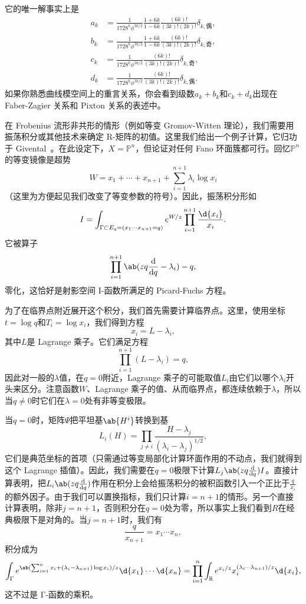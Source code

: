 \documentclass{amsart}
\theoremstyle{definition}
\theoremstyle{remark}
\theoremstyle{plain}
\theoremstyle{definition}
\theoremstyle{remark}
\newcommand{\R}{\mathbb{R}}
\renewcommand{\P}{\mathbb{P}}
\newcommand{\1}{\mathbf{1}}
\newcommand{\2}{\mathbf{2}}
\newcommand{\3}{\mathbf{3}}
\begin{document}
它的唯一解事实上是
\begin{align*}
    a_k &= \frac{1}{1728^k \phi^{3k/2}} \frac{1+6k}{1-6k} \frac{(6k)!}{(3k)!(2k)!} \delta_{k, \text{偶}},  \\
    b_k &= \frac{1}{1728^k \phi^{3k/2}} \frac{1+6k}{1-6k}\frac{(6k)!}{(3k)!(2k)!} \delta_{k, \text{奇}},  \\
    c_k &= \frac{1}{1728^k \phi^{3k/2}}\frac{(6k)!}{(3k)!(2k)!} \delta_{k, \text{奇}}, \\
    d_k &= \frac{1}{1728^k \phi^{3k/2}} \frac{(6k)!}{(3k)!(2k)!} \delta_{k, \text{偶}}.
\end{align*}
如果你熟悉曲线模空间上的重言关系，你会看到级数\(a_k + b_k\)和\(c_k + d_k\)出现在 Faber-Zagier 关系和 Pixton 关系的表述中。

在 Frobenius 流形非共形的情形（例如等变 Gromov-Witten 理论），我们需要用振荡积分或其他技术来确定 R-矩阵的初值。这里我们给出一个例子计算，它归功于 Givental~\cite{Givental2001semisimple}。在此设定下，\(X = \P^n\)，但论证对任何 Fano 环面簇都可行。回忆\(\P^n\)的等变镜像是超势
\[ W = x_1 + \cdots + x_{n+1} + \sum_{i=1}^{n+1} \lambda_i \log x_i \]
（这里为方便起见我们改变了等变参数的符号）。因此，振荡积分形如
\[ I = \int_{\Gamma \subset E_q = (x_1 \cdots x_{n+1}=q)} e^{W/z} \prod_{i=1}^{n+1} \frac{\d{x_i}}{x_i}. \]
它被算子
\[ \prod_{i=1}^{n+1}\ab(zq \odv{}{q} -\lambda_i) - q, \]
零化，这恰好是射影空间 I-函数所满足的 Picard-Fuchs 方程。

为了在临界点附近展开这个积分，我们首先需要计算临界点。这里，使用坐标\(t = \log q\)和\(T_i = \log x_i\)，我们得到方程
\[ x_i = L - \lambda_i, \]
其中\(L\)是 Lagrange 乘子。它们满足方程
\[ \prod_{i=1}^{n+1} (L - \lambda_i) = q, \]
因此对一般的\(\lambda\)值，在\(q = 0\)附近，Lagrange 乘子的可能取值\(L_i\)由它们以哪个\(\lambda_i\)开头来区分。注意函数\(W\)、Lagrange 乘子的值、从而临界点，都连续依赖于\(\lambda\)，所以当\(q \neq 0\)时它们在\(\lambda = 0\)处有非等变极限。

当\(q = 0\)时，矩阵\(\Psi\)把平坦基\(\ab{H^i}\)转换到基
\[ L_i(H) = \prod_{j \neq i} \frac{H - \lambda_j}{(\lambda_i - \lambda_j)^{1/2}}, \]
它们是典范坐标的首项（只需通过等变局部化计算环面作用的不动点，我们就得到这个 Lagrange 插值）。因此，我们需要在\(q = 0\)极限下计算\(L_j \ab(z q \odv{}{q}) I\)。直接计算表明，把\(L_i \ab(z q \odv{}{q})\)作用在积分上会给振荡积分的被积函数引入一个正比于\(\frac{q}{x_i}\)的额外因子。由于我们可以置换指标，我们只计算\(i = n+1\)的情形。另一个直接计算表明，除非\( j = n+1\)，否则积分在\(q = 0\)处为零，所以事实上我们看到\(R\)在经典极限下是对角的。当\(j = n+1\)时，我们有
\[ \frac{q}{x_{n+1}} = x_1 \cdots x_n, \]
积分成为
\[ \int_{\Gamma} e^{\ab( \sum_{i=1}^n x_i + (\lambda_i - \lambda_{n+1})\log x_i ) / z} \d{x_1} \cdots \d{x_n} = \prod_{i=1}^n \int_{\R} e^{x_i/z} x_i^{(\lambda_i - \lambda_{n+1})/z} \d{x_i}, \]
这不过是 Γ-函数的乘积。
\end{document}
